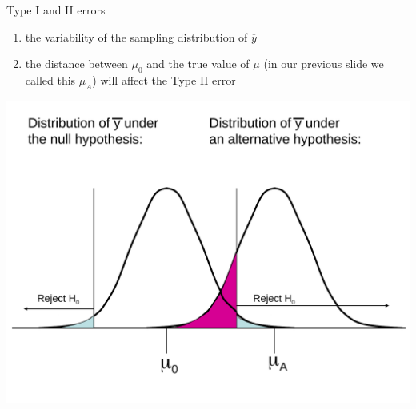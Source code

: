 \documentclass{beamer}\usepackage[]{graphicx}\usepackage[]{color}
\begin{document}
\begin{frame}[fragile]{Type I and II errors}


\begin{minipage}{0.47\textwidth}
	\small
			\begin{enumerate}
		\item[(i)] the variability of the sampling distribution of $\overline{y}$ 
		\item[(ii)] the distance between $\mu_0$ and the true value of $\mu$ (in our previous slide we called this $\mu_A$) will affect the Type II error
	\end{enumerate}

\end{minipage}
\begin{minipage}{0.47\textwidth}
\includegraphics[scale=0.25]{HypTest3.pdf}
\end{minipage}	


\end{frame}
\end{document}
